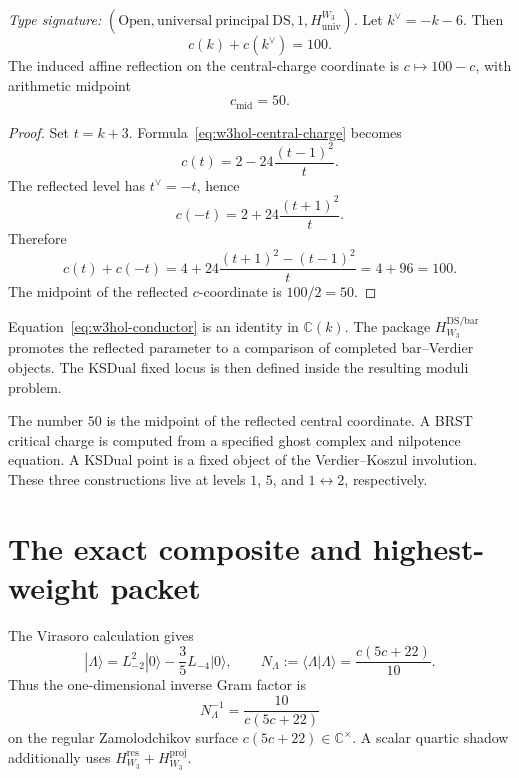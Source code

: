 \begin{theorem}
\label{thm:w3hol-conductor}
\emph{Type signature:}
\((\mathrm{Open},\mathrm{universal\ principal\ DS},1,
H_{\mathrm{univ}}^{W_3})\).
Let \(k^\vee=-k-6\).  Then
\begin{equation}\label{eq:w3hol-conductor}
c(k)+c(k^\vee)=100.
\end{equation}
The induced affine reflection on the central-charge coordinate is
\(c\mapsto100-c\), with arithmetic midpoint
\begin{equation}\label{eq:w3hol-self-dual-point}
c_{\mathrm{mid}}=50.
\end{equation}
\end{theorem}

\begin{proof}
Set \(t=k+3\).  Formula~\eqref{eq:w3hol-central-charge} becomes
\[
c(t)=2-24\frac{(t-1)^2}{t}.
\]
The reflected level has \(t^\vee=-t\), hence
\[
c(-t)=2+24\frac{(t+1)^2}{t}.
\]
Therefore
\[
c(t)+c(-t)
=4+24\frac{(t+1)^2-(t-1)^2}{t}
=4+96
=100.
\]
The midpoint of the reflected \(c\)-coordinate is \(100/2=50\).
\end{proof}

\begin{remark}
\label{rem:w3hol-w-complementarity}
Equation~\eqref{eq:w3hol-conductor} is an identity in
\(\mathbb C(k)\).  The package \(H_{W_3}^{\mathrm{DS/bar}}\) promotes
the reflected parameter to a comparison of completed bar--Verdier
objects.  The KSDual fixed locus is then defined inside the resulting
moduli problem.
\end{remark}

\begin{remark}
\label{rem:w3hol-self-dual-vs-critical}
The number \(50\) is the midpoint of the reflected central coordinate.
A BRST critical charge is computed from a specified ghost complex and
nilpotence equation.  A KSDual point is a fixed object of the
Verdier--Koszul involution.  These three constructions live at levels
\(1\), \(5\), and \(1\leftrightarrow2\), respectively.
\end{remark}

\section{The exact composite and highest-weight packet}
\label{sec:w3hol-lambda}

The Virasoro calculation gives
\[
|\Lambda\rangle
=L_{-2}^2|0\rangle-\frac35L_{-4}|0\rangle,
\qquad
N_\Lambda
:=\langle\Lambda|\Lambda\rangle
=\frac{c(5c+22)}{10}.
\]
Thus the one-dimensional inverse Gram factor is
\[
N_\Lambda^{-1}=\frac{10}{c(5c+22)}
\]
on the regular Zamolodchikov surface
\(c(5c+22)\in\mathbb C^\times\).  A scalar quartic shadow additionally
uses \(H_{W_3}^{\mathrm{res}}+H_{W_3}^{\mathrm{proj}}\).

